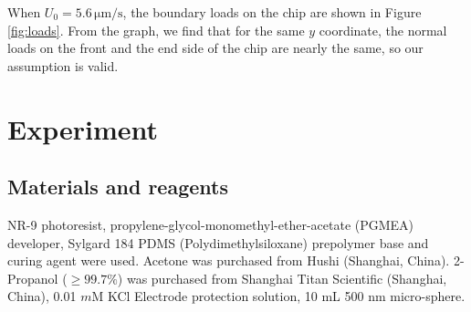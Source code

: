 \documentclass[journal,svgnames,twocolumn,x11names]{IEEEtran}
\begin{document}
When $U_0=5.6\,\mathrm{\mu m/s}$, the boundary loads on the chip are shown in Figure \ref{fig:loads}. From the graph, we find that for the same $y$ coordinate, the normal loads on the front and the end side of the chip are nearly the same, so our assumption is valid.
\section{Experiment}
\subsection{Materials and reagents}
NR-9 photoresist, propylene-glycol-monomethyl-ether-acetate (PGMEA) developer, Sylgard 184 PDMS (Polydimethylsiloxane) prepolymer base and curing agent were used. Acetone was purchased from Hushi (Shanghai, China). 2-Propanol ($\geq99.7\%$) was purchased from Shanghai Titan Scientific (Shanghai, China), 0.01 $m$M KCl Electrode protection solution, 10 mL 500 nm micro-sphere. 
\end{document}
